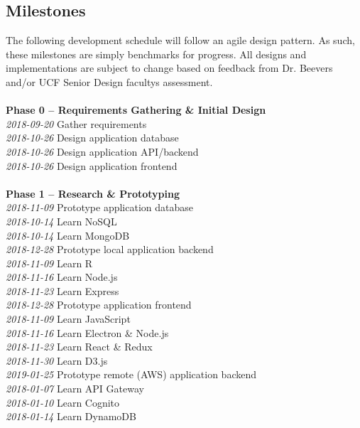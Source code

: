 \subsection{Milestones}
The following development schedule will follow an agile design pattern. As such, these milestones are simply benchmarks for progress. All designs and implementations are subject to change based on feedback from Dr. Beever\textquotesingle s and/or UCF Senior Design faculty\textquotesingle s assessment.\\\\
\textbf{Phase 0 -- Requirements Gathering \& Initial Design}\\
\textit{2018-09-20}	Gather requirements\\
\textit{2018-10-26}	Design application database\\
\textit{2018-10-26}	Design application API/backend\\
\textit{2018-10-26}	Design application frontend\\\\
\textbf{Phase 1 -- Research \& Prototyping}\\
\textit{2018-11-09}	Prototype application database\\
\tab \textit{2018-10-14}	Learn NoSQL\\
\tab \textit{2018-10-14}	Learn MongoDB\\
\textit{2018-12-28}	Prototype local application backend\\
\tab \textit{2018-11-09}	Learn R\\
\tab \textit{2018-11-16}	Learn Node.js\\
\tab \textit{2018-11-23}	Learn Express\\
\textit{2018-12-28}	Prototype application frontend\\
\tab \textit{2018-11-09}	Learn JavaScript\\
\tab \textit{2018-11-16}	Learn Electron \& Node.js\\
\tab \textit{2018-11-23}	Learn React \& Redux\\
\tab \textit{2018-11-30}	Learn D3.js\\
\textit{2019-01-25}	Prototype remote (AWS) application backend\\
\tab \textit{2018-01-07}	Learn API Gateway\\
\tab \textit{2018-01-10}	Learn Cognito\\
\tab \textit{2018-01-14}	Learn DynamoDB\\

